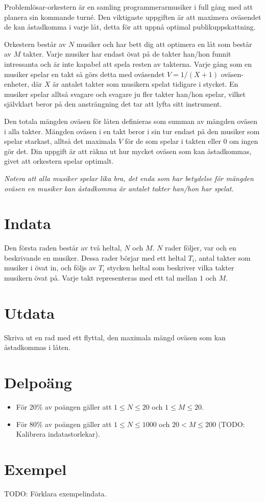 
Problemlösar-orkestern är en samling programmerarmusiker i full gång med att planera sin kommande turné. Den viktigaste uppgiften är att maximera oväsendet de kan åstadkomma i varje låt, detta för att uppnå optimal publikuppskattning.

Orkestern består av $N$ musiker och har bett dig att optimera en låt som består av $M$ takter. Varje musiker har endast övat på de takter han/hon funnit intressanta och är inte kapabel att spela resten av takterna. Varje gång som en musiker spelar en takt så görs detta med oväsendet $V=1/(X+1)$ oväsen-enheter, där $X$ är antalet takter som musikern spelat tidigare i stycket. En musiker spelar alltså svagare och svagare ju fler takter han/hon spelar, vilket självklart beror på den ansträngning det tar att lyfta sitt instrument.

Den totala mängden oväsen för låten definieras som summan av mängden oväsen i alla takter. Mängden oväsen i en takt beror i sin tur endast på den musiker som spelar starkast, alltså det maximala $V$ för de som spelar i takten eller $0$ om ingen gör det. Din uppgift är att räkna ut hur mycket oväsen som kan åstadkommas, givet att orkestern spelar optimalt.

\emph{Notera att alla musiker spelar lika bra, det enda som har betydelse för mängden oväsen en musiker kan åstadkomma är antalet takter han/hon har spelat.}

\section*{Indata}
Den första raden består av två heltal, $N$ och $M$. $N$ rader följer, var och en beskrivande en musiker. Dessa rader börjar med ett heltal $T_i$, antal takter som musiker i övat in, och följs av $T_i$ stycken heltal som beskriver vilka takter musikern övat på. Varje takt representeras med ett tal mellan $1$ och $M$.

\section*{Utdata}
Skriva ut en rad med ett flyttal, den maximala mängd oväsen som kan åstadkommas i låten.

\section*{Delpoäng}
\begin{itemize}
\item För 20\% av poängen gäller att $1 \leq N \leq 20$ och $1 \leq M \leq 20$.
\item För 80\% av poängen gäller att $1 \leq N \leq 1000$ och $20 < M \leq 200$ (TODO: Kalibrera indatastorlekar).
\end{itemize}

\section*{Exempel}
TODO: Förklara exempelindata.
